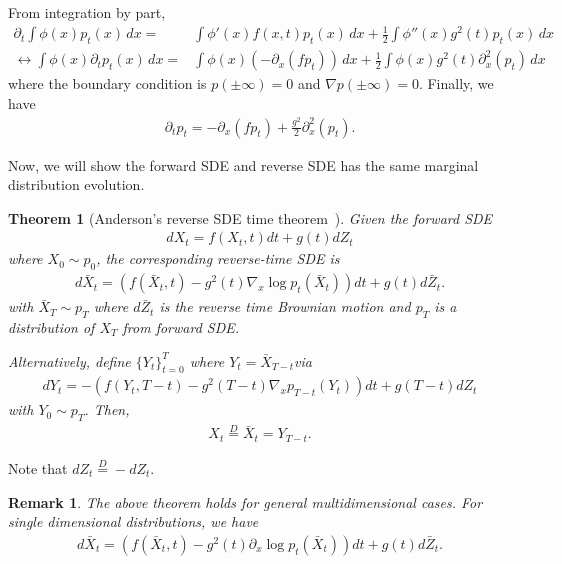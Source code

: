 \documentclass[11pt]{article}
\newtheorem{theorem}{Theorem}
\newtheorem{remark}{Remark}
\begin{document}
From integration by part, 
\begin{align}
    \partial_t \int \phi(x) p_t(x)\, dx =& \int \phi'(x)f(x, t)p_t(x)\, dx + \frac{1}{2}\int \phi''(x)g^2(t)p_t(x)\, dx\\
    \leftrightarrow \int \phi(x) \partial_t p_t(x)\, dx =& \int \phi(x)(-\partial_x (f p_t))\, dx + \frac{1}{2}\int \phi(x)g^2(t)\partial_x^2 (p_t)\, dx
\end{align}
where the boundary condition is $p(\pm \infty)=0$ and $\nabla p(\pm \infty)=0$.
Finally, we have
\begin{align}
    \partial_t p_t = -\partial_x(fp_t) + \frac{g^2}{2}\partial_x^2 (p_t).
\end{align}

Now, we will show the forward SDE and reverse SDE has the same marginal distribution evolution.
\begin{theorem}[Anderson's reverse SDE time theorem~\cite{anderson1982reverse}]
Given the forward SDE
\begin{align}
    dX_t = f(X_t, t)dt + g(t)dZ_t
\end{align}
where $X_0\sim p_0$,
the corresponding reverse-time SDE is
\begin{align}
    d\bar{X}_t = (f(\bar{X}_t, t) - g^2(t) \nabla_x\log p_t(\bar{X}_t))dt+g(t) d\bar{Z}_t.
\end{align}
with $\bar{X}_T\sim p_T$ where $d\bar{Z}_t$ is the reverse time Brownian motion and $p_T$ is a distribution of $X_T$ from forward SDE.

Alternatively, define $\{Y_t\}_{t=0}^T$ where $Y_t= \bar{X}_{T-t}$via
\begin{align}
    dY_t =  - (f(Y_t, T-t) - g^2(T-t)\nabla_x p_{T-t}(Y_t))dt + g(T-t)dZ_t
\end{align}
with $Y_0\sim p_T$.
Then,
\begin{align}
    X_t \stackrel{D}{=} \bar{X}_t =Y_{T-t}.
\end{align}
\end{theorem}
Note that $dZ_t \stackrel{D}{=} -dZ_t$.

\begin{remark}
    The above theorem holds for general multidimensional cases.
    For single dimensional distributions, we have
\begin{align}
    d\bar{X}_t = (f(\bar{X}_t, t) - g^2(t) \partial_x\log p_t(\bar{X}_t))dt+g(t) d\bar{Z}_t.
\end{align}
\end{remark}
\end{document}
